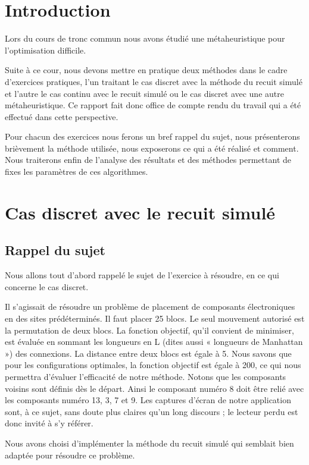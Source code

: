 \documentclass{report}
\begin{document}
\tableofcontents

\chapter{Introduction}
\minitoc
Lors du cours de tronc commun nous avons étudié une métaheuristique pour l'optimisation difficile.

Suite à ce cour, nous devons mettre en pratique deux méthodes dans le cadre d'exercices pratiques, l'un traitant le cas discret avec la méthode du recuit simulé et l'autre le cas continu avec le recuit simulé ou le cas discret avec une autre métaheuristique. Ce rapport fait donc office de compte rendu du travail qui a été effectué dans cette perspective.

Pour chacun des exercices nous ferons un bref rappel du sujet, nous présenterons brièvement la méthode utilisée, nous exposerons ce qui a été réalisé et comment. Nous traiterons enfin de l'analyse des résultats et des méthodes permettant de fixes les paramètres de ces algorithmes.
\newpage

\chapter{Cas discret avec le recuit simulé}
\minitoc
\section{Rappel du sujet}
Nous allons tout d’abord rappelé le sujet de l’exercice à résoudre, en ce qui concerne
le cas discret.

Il s’agissait de résoudre un problème de placement de composants électroniques
en des sites prédéterminés. Il faut placer 25 blocs. Le seul mouvement autorisé est
la permutation de deux blocs. La fonction objectif, qu’il convient de minimiser, est
évaluée en sommant les longueurs en L (dites aussi « longueurs de Manhattan ») des
connexions. La distance entre deux blocs est égale à 5. Nous savons que pour les
configurations optimales, la fonction objectif est égale à 200, ce qui nous permettra
d’évaluer l’efficacité de notre méthode. Notons que les composants voisins sont définis dès le départ. Ainsi le composant numéro 8 doit être relié avec les composants
numéro 13, 3, 7 et 9. Les captures d’écran de notre application sont, à ce sujet, sans
doute plus claires qu’un long discours ; le lecteur perdu est donc invité à s’y référer.

Nous avons choisi d’implémenter la méthode du recuit simulé qui semblait bien
adaptée pour résoudre ce problème.
\end{document}
